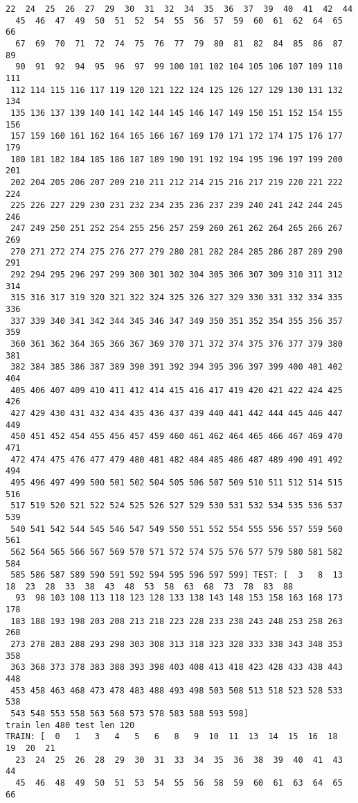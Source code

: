 \documentclass[11pt]{article}
\begin{document}
\begin{Verbatim}[commandchars=\\\{\}]
  22  24  25  26  27  29  30  31  32  34  35  36  37  39  40  41  42  44
  45  46  47  49  50  51  52  54  55  56  57  59  60  61  62  64  65  66
  67  69  70  71  72  74  75  76  77  79  80  81  82  84  85  86  87  89
  90  91  92  94  95  96  97  99 100 101 102 104 105 106 107 109 110 111
 112 114 115 116 117 119 120 121 122 124 125 126 127 129 130 131 132 134
 135 136 137 139 140 141 142 144 145 146 147 149 150 151 152 154 155 156
 157 159 160 161 162 164 165 166 167 169 170 171 172 174 175 176 177 179
 180 181 182 184 185 186 187 189 190 191 192 194 195 196 197 199 200 201
 202 204 205 206 207 209 210 211 212 214 215 216 217 219 220 221 222 224
 225 226 227 229 230 231 232 234 235 236 237 239 240 241 242 244 245 246
 247 249 250 251 252 254 255 256 257 259 260 261 262 264 265 266 267 269
 270 271 272 274 275 276 277 279 280 281 282 284 285 286 287 289 290 291
 292 294 295 296 297 299 300 301 302 304 305 306 307 309 310 311 312 314
 315 316 317 319 320 321 322 324 325 326 327 329 330 331 332 334 335 336
 337 339 340 341 342 344 345 346 347 349 350 351 352 354 355 356 357 359
 360 361 362 364 365 366 367 369 370 371 372 374 375 376 377 379 380 381
 382 384 385 386 387 389 390 391 392 394 395 396 397 399 400 401 402 404
 405 406 407 409 410 411 412 414 415 416 417 419 420 421 422 424 425 426
 427 429 430 431 432 434 435 436 437 439 440 441 442 444 445 446 447 449
 450 451 452 454 455 456 457 459 460 461 462 464 465 466 467 469 470 471
 472 474 475 476 477 479 480 481 482 484 485 486 487 489 490 491 492 494
 495 496 497 499 500 501 502 504 505 506 507 509 510 511 512 514 515 516
 517 519 520 521 522 524 525 526 527 529 530 531 532 534 535 536 537 539
 540 541 542 544 545 546 547 549 550 551 552 554 555 556 557 559 560 561
 562 564 565 566 567 569 570 571 572 574 575 576 577 579 580 581 582 584
 585 586 587 589 590 591 592 594 595 596 597 599] TEST: [  3   8  13  18  23  28  33  38  43  48  53  58  63  68  73  78  83  88
  93  98 103 108 113 118 123 128 133 138 143 148 153 158 163 168 173 178
 183 188 193 198 203 208 213 218 223 228 233 238 243 248 253 258 263 268
 273 278 283 288 293 298 303 308 313 318 323 328 333 338 343 348 353 358
 363 368 373 378 383 388 393 398 403 408 413 418 423 428 433 438 443 448
 453 458 463 468 473 478 483 488 493 498 503 508 513 518 523 528 533 538
 543 548 553 558 563 568 573 578 583 588 593 598]
train len 480 test len 120
TRAIN: [  0   1   3   4   5   6   8   9  10  11  13  14  15  16  18  19  20  21
  23  24  25  26  28  29  30  31  33  34  35  36  38  39  40  41  43  44
  45  46  48  49  50  51  53  54  55  56  58  59  60  61  63  64  65  66

\end{Verbatim}
\end{document}
